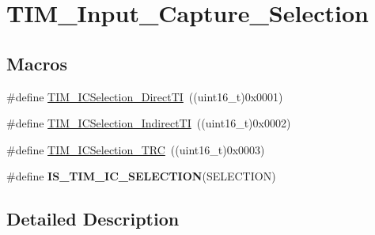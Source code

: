 \hypertarget{group___t_i_m___input___capture___selection}{\section{T\-I\-M\-\_\-\-Input\-\_\-\-Capture\-\_\-\-Selection}
\label{group___t_i_m___input___capture___selection}
}
\subsection*{Macros}
\begin{DoxyCompactItemize}
\item 
\#define \hyperlink{group___t_i_m___input___capture___selection_ga3d38876044457b7faefe951d367ac8c3}{T\-I\-M\-\_\-\-I\-C\-Selection\-\_\-\-Direct\-T\-I}~((uint16\-\_\-t)0x0001)
\item 
\#define \hyperlink{group___t_i_m___input___capture___selection_ga2289b684133ac0b81ddfcd860d01b144}{T\-I\-M\-\_\-\-I\-C\-Selection\-\_\-\-Indirect\-T\-I}~((uint16\-\_\-t)0x0002)
\item 
\#define \hyperlink{group___t_i_m___input___capture___selection_ga2cd464e97ffd6ea3208ec65672f9a373}{T\-I\-M\-\_\-\-I\-C\-Selection\-\_\-\-T\-R\-C}~((uint16\-\_\-t)0x0003)
\item 
\#define {\bfseries I\-S\-\_\-\-T\-I\-M\-\_\-\-I\-C\-\_\-\-S\-E\-L\-E\-C\-T\-I\-O\-N}(S\-E\-L\-E\-C\-T\-I\-O\-N)
\end{DoxyCompactItemize}


\subsection{Detailed Description}



